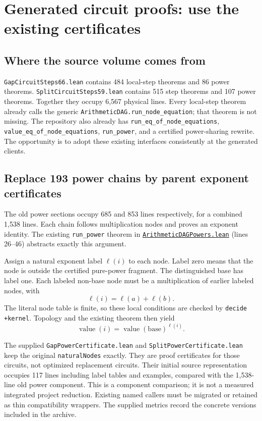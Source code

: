 \documentclass[11pt,letterpaper]{article}
\newcommand{\code}[1]{\nolinkurl{#1}}
\newcommand{\src}[2]{\href{https://github.com/VladimirReshetnikov/ProveIt/blob/60e9c5d620c6c387d932876cfa2d9376f64ea56c/Computability/DiophantineConsistency/Lean/DiophantineConsistency/#1.lean}{\nolinkurl{#1.lean}} (lines #2)}
\begin{document}
\section{Generated circuit proofs: use the existing certificates}

\subsection{Where the source volume comes from}

\code{GapCircuitSteps66.lean} contains 484 local-step theorems and 86
power theorems. \code{SplitCircuitSteps59.lean} contains 515 step theorems
and 107 power theorems. Together they occupy 6,567 physical lines.
Every local-step theorem already calls the generic
\code{ArithmeticDAG.run_node_equation}; that theorem is not missing.
The repository also already has \code{run_eq_of_node_equations},
\code{value_eq_of_node_equations}, \code{run_power}, and a certified
power-sharing rewrite. The opportunity is to adopt these existing
interfaces consistently at the generated clients.

\subsection{Replace 193 power chains by parent exponent certificates}

The old power sections occupy 685 and 853 lines respectively, for a
combined 1,538 lines. Each chain follows multiplication nodes and proves
an exponent identity. The existing \code{run_power} theorem in
\src{ArithmeticDAGPowers}{26--46} abstracts exactly this argument.

Assign a natural exponent label \(\ell(i)\) to each node. Label zero
means that the node is outside the certified pure-power fragment.
The distinguished base has label one. Each labeled non-base node must
be a multiplication of earlier labeled nodes, with
\[
\ell(i)=\ell(a)+\ell(b).
\]
The literal node table is finite, so these local conditions are checked
by \code{decide +kernel}. Topology and the existing theorem then yield
\[
\operatorname{value}(i)=\operatorname{value}(\mathrm{base})^{\ell(i)}.
\]

The supplied \code{GapPowerCertificate.lean} and
\code{SplitPowerCertificate.lean} keep the original
\code{naturalNodes} exactly. They are proof certificates for those
circuits, not optimized replacement circuits. Their initial source
representation occupies 117 lines including label tables and examples,
compared with the 1,538-line old power component. This is a component
comparison; it is not a measured integrated project reduction. Existing
named callers must be migrated or retained as thin compatibility wrappers.
The supplied metrics record the concrete versions included in the archive.
\end{document}
